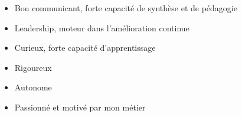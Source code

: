 %
%
%

\twocolumnsection
{
\begin{skills}
\end{skills}}
{
\vspace{1em}
\begin{itemize}
	\item Bon communicant, forte capacité de synthèse et de pédagogie
    \item Leadership, moteur dans l'amélioration continue
    \item Curieux, forte capacité d'apprentissage
	\item Rigoureux
    \item Autonome
	\item Passionné et motivé par mon métier
\end{itemize}
}
